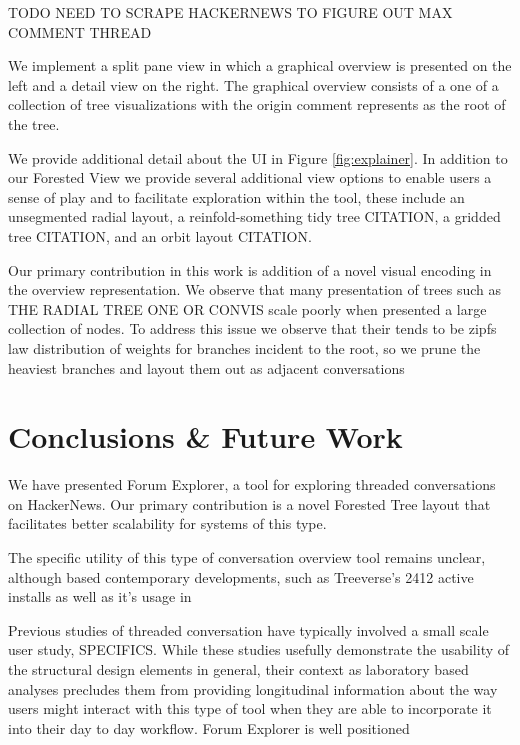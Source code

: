 \documentclass{egpubl}
\begin{document}
TODO NEED TO SCRAPE HACKERNEWS TO FIGURE OUT MAX COMMENT THREAD

We implement a split pane view in which a graphical overview is presented on the left and a detail view on the right. The graphical overview consists of a one of a collection of tree visualizations with the origin comment represents as the root of the tree.

We provide additional detail about the UI in Figure \ref{fig:explainer}. In addition to our Forested View we provide several additional view options to enable users a sense of play and to facilitate exploration within the tool, these include an unsegmented radial layout, a reinfold-something tidy tree CITATION, a gridded tree CITATION, and an orbit layout CITATION. 


Our primary contribution in this work is addition of a novel visual encoding in the overview representation. We observe that many presentation of trees such as THE RADIAL TREE ONE OR CONVIS scale poorly when presented a large collection of nodes. To address this issue we observe that their tends to be zipfs law distribution of weights for branches incident to the root, so we prune the heaviest branches and layout them out as adjacent conversations 


\section{Conclusions \& Future Work}

We have presented Forum Explorer, a tool for exploring threaded conversations on HackerNews. Our primary contribution is a novel Forested Tree layout that facilitates better scalability for systems of this type.


The specific utility of this type of conversation overview tool remains unclear, although based contemporary developments, such as Treeverse's 2412 active installs as well as it's usage in 

Previous studies of threaded conversation have typically involved a small scale user study, SPECIFICS. While these studies usefully demonstrate the usability of the structural design elements in general, their context as laboratory based analyses precludes them from providing longitudinal information about the way users might interact with this type of tool when they are able to incorporate it into their day to day workflow. Forum Explorer is well positioned 
\end{document}
